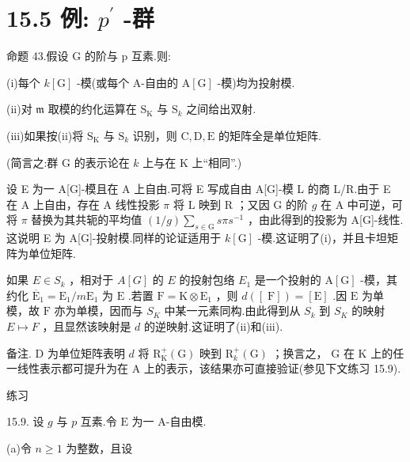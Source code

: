 \documentclass[10pt]{article}
\begin{document}
\section*{15.5 例: \({p}^{\prime }\) -群}

命题 43.假设 \(\mathrm{G}\) 的阶与 p 互素.则:

(i)每个 \(k\left\lbrack  \mathrm{G}\right\rbrack\) -模(或每个 A-自由的 \(\mathrm{A}\left\lbrack  \mathrm{G}\right\rbrack\) -模)均为投射模.

(ii)对 \(\mathfrak{m}\) 取模的约化运算在 \({\mathrm{S}}_{\mathrm{K}}\) 与 \({\mathrm{S}}_{k}\) 之间给出双射.

(iii)如果按(ii)将 \({\mathrm{S}}_{\mathrm{K}}\) 与 \({\mathrm{S}}_{k}\) 识别，则 \(\mathrm{C},\mathrm{D},\mathrm{E}\) 的矩阵全是单位矩阵.

(简言之:群 G 的表示论在 \(k\) 上与在 K 上“相同”.)

设 E 为一 A[G]-模且在 A 上自由.可将 E 写成自由 A[G]-模 L 的商 L/R.由于 E 在 A 上自由，存在 A 线性投影 \(\pi\) 将 \(\mathrm{L}\) 映到 \(\mathrm{R}\) ；又因 \(\mathrm{G}\) 的阶 \(g\) 在 \(\mathrm{A}\) 中可逆，可将 \(\pi\) 替换为其共轭的平均值 \(\left( {1/g}\right) \mathop{\sum }\limits_{{s \in  \mathrm{G}}}{s\pi }{s}^{-1}\) ，由此得到的投影为 A[G]-线性.这说明 E 为 A[G]-投射模.同样的论证适用于 \(k\left\lbrack  \mathrm{G}\right\rbrack\) -模.这证明了(i)，并且卡坦矩阵为单位矩阵.

如果 \(E \in  {S}_{k}\) ，相对于 \(A\left\lbrack  G\right\rbrack\) 的 \(E\) 的投射包络 \({E}_{1}\) 是一个投射的 \(\mathrm{A}\left\lbrack  \mathrm{G}\right\rbrack\) -模，其约化 \({\overline{\mathrm{E}}}_{1} = {\mathrm{E}}_{1}/m{\mathrm{E}}_{1}\) 为 \(\mathrm{E}\) .若置 \(\mathrm{F} = \mathrm{K} \otimes  {\mathrm{E}}_{1}\) ，则 \(d\left( \left\lbrack  \mathrm{\;F}\right\rbrack  \right)  = \left\lbrack  \mathrm{E}\right\rbrack\) .因 \(\mathrm{E}\) 为单模，故 \(\mathrm{F}\) 亦为单模，因而与 \({S}_{K}\) 中某一元素同构.由此得到从 \({S}_{k}\) 到 \({S}_{K}\) 的映射 \(E \mapsto  F\) ，且显然该映射是 \(d\) 的逆映射.这证明了(ii)和(iii).

备注. \(\mathrm{D}\) 为单位矩阵表明 \(d\) 将 \({\mathrm{R}}_{\mathrm{K}}^{ + }\left( \mathrm{G}\right)\) 映到 \({\mathrm{R}}_{k}^{ + }\left( \mathrm{G}\right)\) ；换言之， \(\mathrm{G}\) 在 \(\mathrm{K}\) 上的任一线性表示都可提升为在 A 上的表示，该结果亦可直接验证(参见下文练习 15.9).

练习

15.9. 设 \(g\) 与 \(p\) 互素.令 \(\mathrm{E}\) 为一 A-自由模.

(a)令 \(n \geq  1\) 为整数，且设
\end{document}
